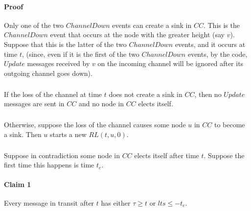 \paragraph{Proof}Only one of the two $ChannelDown$ events can create a sink in $CC$. This is the $ChannelDown$ event that occurs at the node with the greater height (say $v$). Suppose that this is the latter of the two $ChannelDown$ events, and it occurs at time $t$, (since, even if it is the first of the two $ChannelDown$ events, by the code, $Update$ messages received by $v$ on the incoming channel will be ignored after its outgoing channel goes down).
\subparagraph{}If the loss of the channel at time $t$ does not create a sink in $CC$, then no $Update$ messages are sent in $CC$ and no node in $CC$ elects itself.
\subparagraph{}Otherwise, suppose the loss of the channel causes some node $u$ in $CC$ to become a sink. Then $u$ starts a new $RL (t, u, 0)$.
\subparagraph{}Suppose in contradiction some node in $CC$ elects itself after time $t$. Suppose the first time this happens is time $t_e$.
\paragraph{Claim 1}Every message in transit after $t$ has either $\tau \geq t$ or $lts \leq -t_e$.
